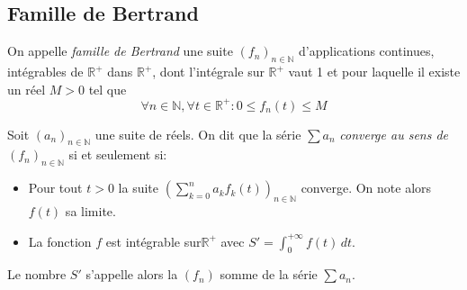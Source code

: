 \subsection*{Famille de Bertrand}
On appelle \emph{famille de Bertrand} une suite $(f_{n})_{n\in \mathbb{N}}$ d'applications continues, intégrables de $\mathbb{R}^{+}$ dans $\mathbb{R}^{+}$, dont l'intégrale sur $\mathbb{R}^{+}$ vaut 1 et pour laquelle il existe un réel $M>0$ tel que
$$\forall n \in \mathbb{N}, \forall t \in \mathbb{R}^{+}:0\leq f_{n}(t)\leq M$$

Soit $(a_{n})_{n\in\mathbb{N}}$ une suite de réels. On dit que la série $\sum a_{n}$ \emph{converge au sens de} $(f_{n})_{n\in \mathbb{N}}$ si et seulement si:

\begin{itemize}
\item Pour tout $t>0$ la suite $(\sum _{k=0}^{n}a_{k}f_{k}(t))_{n\in \mathbb{N}}$ converge. On note alors $f(t)$ sa limite.
\item La fonction $f$ est intégrable sur$\mathbb{R}^{+}$ avec $S'=\int_{0}^{+\infty}f(t)\,dt$.
\end{itemize}

Le nombre $S'$ s'appelle alors la $(f_{n})$ somme de la série $\sum a_{n}$.

